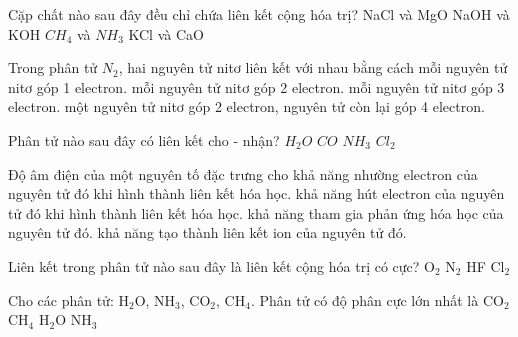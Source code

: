 \begin{ex}
	Cặp chất nào sau đây đều chỉ chứa liên kết cộng hóa trị?
	\choice
	{NaCl và MgO}
	{NaOH và KOH}
	{\True $CH_4$ và $NH_3$}
	{KCl và CaO}
\end{ex}
\begin{ex}
	Trong phân tử $N_2$, hai nguyên tử nitơ liên kết với nhau bằng cách
	\choice
	{mỗi nguyên tử nitơ góp 1 electron.}
	{mỗi nguyên tử nitơ góp 2 electron.}
	{\True mỗi nguyên tử nitơ góp 3 electron.}
	{một nguyên tử nitơ góp 2 electron, nguyên tử còn lại góp 4 electron.}
\end{ex}
\begin{ex}
	Phân tử nào sau đây có liên kết cho - nhận?
	\choice
	{$H_2O$}
	{\True $CO$}
	{$NH_3$}
	{$Cl_2$}
\end{ex}
\begin{ex}
	Độ âm điện của một nguyên tố đặc trưng cho
	\choice
	{khả năng nhường electron của nguyên tử đó khi hình thành liên kết hóa học.}
	{\True khả năng hút electron của nguyên tử đó khi hình thành liên kết hóa học.}
	{khả năng tham gia phản ứng hóa học của nguyên tử đó.}
	{khả năng tạo thành liên kết ion của nguyên tử đó.}
\end{ex}
\begin{ex}
	Liên kết trong phân tử nào sau đây là liên kết cộng hóa trị có cực?
	\choice
	{O$_2$}
	{N$_2$}
	{\True HF}
	{Cl$_2$}
\end{ex}
\begin{ex}
	Cho các phân tử: H$_2$O, NH$_3$, CO$_2$, CH$_4$. Phân tử có độ phân cực lớn nhất là
	\choice
	{CO$_2$}
	{CH$_4$}
	{\True H$_2$O}
	{NH$_3$}
\end{ex}
